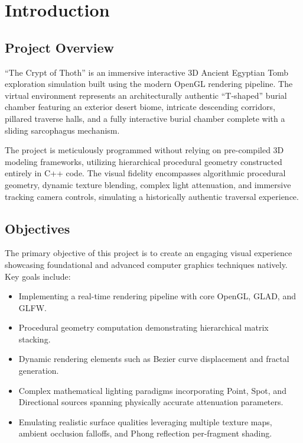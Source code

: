 \documentclass[12pt, a4paper]{article}
\begin{document}
\newpage
\tableofcontents
\newpage

\section{Introduction}

\subsection{Project Overview}
``The Crypt of Thoth'' is an immersive interactive 3D Ancient Egyptian Tomb exploration simulation built using the modern OpenGL rendering pipeline. The virtual environment represents an architecturally authentic ``T-shaped'' burial chamber featuring an exterior desert biome, intricate descending corridors, pillared traverse halls, and a fully interactive burial chamber complete with a sliding sarcophagus mechanism. 

The project is meticulously programmed without relying on pre-compiled 3D modeling frameworks, utilizing hierarchical procedural geometry constructed entirely in C++ code. The visual fidelity encompasses algorithmic procedural geometry, dynamic texture blending, complex light attenuation, and immersive tracking camera controls, simulating a historically authentic traversal experience.

\subsection{Objectives}
The primary objective of this project is to create an engaging visual experience showcasing foundational and advanced computer graphics techniques natively. Key goals include:
\begin{itemize}
    \item Implementing a real-time rendering pipeline with core OpenGL, GLAD, and GLFW.
    \item Procedural geometry computation demonstrating hierarchical matrix stacking.
    \item Dynamic rendering elements such as Bezier curve displacement and fractal generation.
    \item Complex mathematical lighting paradigms incorporating Point, Spot, and Directional sources spanning physically accurate attenuation parameters.
    \item Emulating realistic surface qualities leveraging multiple texture maps, ambient occlusion falloffs, and Phong reflection per-fragment shading.
\end{itemize}
\end{document}
